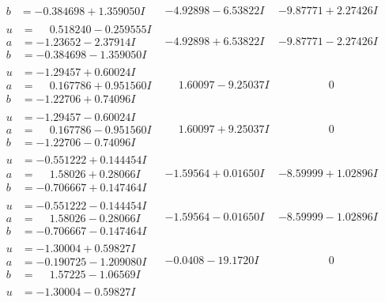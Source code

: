 \documentclass[1p]{elsarticle_modified}
\theoremstyle{definition}
\begin{document}
$$\begin{array}{c|c|c}
\begin{aligned}
b &= -0.384698 + 1.359050 I\end{aligned}
 & -4.92898 - 6.53822 I & -9.87771 + 2.27426 I \\ \hline\begin{aligned}
u &= \phantom{-}0.518240 - 0.259555 I \\
a &= -1.23652 - 2.37914 I \\
b &= -0.384698 - 1.359050 I\end{aligned}
 & -4.92898 + 6.53822 I & -9.87771 - 2.27426 I \\ \hline\begin{aligned}
u &= -1.29457 + 0.60024 I \\
a &= \phantom{-}0.167786 + 0.951560 I \\
b &= -1.22706 + 0.74096 I\end{aligned}
 & \phantom{-}1.60097 - 9.25037 I & \phantom{-0.000000 } 0 \\ \hline\begin{aligned}
u &= -1.29457 - 0.60024 I \\
a &= \phantom{-}0.167786 - 0.951560 I \\
b &= -1.22706 - 0.74096 I\end{aligned}
 & \phantom{-}1.60097 + 9.25037 I & \phantom{-0.000000 } 0 \\ \hline\begin{aligned}
u &= -0.551222 + 0.144454 I \\
a &= \phantom{-}1.58026 + 0.28066 I \\
b &= -0.706667 + 0.147464 I\end{aligned}
 & -1.59564 + 0.01650 I & -8.59999 + 1.02896 I \\ \hline\begin{aligned}
u &= -0.551222 - 0.144454 I \\
a &= \phantom{-}1.58026 - 0.28066 I \\
b &= -0.706667 - 0.147464 I\end{aligned}
 & -1.59564 - 0.01650 I & -8.59999 - 1.02896 I \\ \hline\begin{aligned}
u &= -1.30004 + 0.59827 I \\
a &= -0.190725 - 1.209080 I \\
b &= \phantom{-}1.57225 - 1.06569 I\end{aligned}
 & -0.0408 - 19.1720 I & \phantom{-0.000000 } 0 \\ \hline\begin{aligned}
u &= -1.30004 - 0.59827 I \\

\end{aligned}
\end{array}$$
\end{document}
